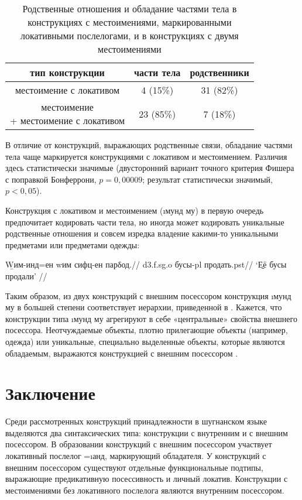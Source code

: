 \begin{table}[h]
 \centering
 \caption{Родственные отношения и обладание частями тела в конструкциях с местоимениями, маркированными локативными послелогами, и в конструкциях с двумя местоимениями}
 \smallskip
 \label{tab:poss9}
 \begin{tabular}{c|cc} \toprule
 тип конструкции & части тела & родственники \\ \midrule
 местоимение с локативом & 4 (15\%) & 31 (82\%) \\
 \makecell{местоимение\\+ местоимение с локативом} & 23 (85\%) & 7 (18\%) \\ \bottomrule
 \end{tabular}
\end{table}

В отличие от конструкций, выражающих родственные связи, обладание частями тела чаще маркируется конструкциями с локативом и местоимением. Различия здесь статистически значимые (двусторонний вариант точного критерия Фишера с поправкой Бонферрони, $p = 0,00009$; результат статистически значимый, $p < 0,05$).

Конструкция с локативом и местоимением (\i{мунд му}) в первую очередь предпочитает кодировать части тела, но иногда может кодировать уникальные родственные отношения и совсем изредка владение какими-то уникальными предметами или предметами одежды:

\begingl
\gla \b{Wим-инд}=ен wим сифц-ен парδод.//
 {\sc d3.f.sg.o} бусы-{\sc pl} продать.{\sc pst}//
\glft ‘\b{Её} бусы продали’ //
\endgl \xe

Таким образом, из двух конструкций с внешним посессором конструкция \i{мунд му} в большей степени соответствует иерархии, приведенной в \parencite{koenig_haspelmath1997}. Кажется, что конструкции типа \i{мунд му} агрегируют в себе «центральные» свойства внешнего посессора. Неотчуждаемые объекты, плотно прилегающие объекты (например, одежда) или уникальные, специально выделенные объекты, которые являются обладаемым, выражаются конструкцией с внешним посессором \parencite{kibrik_etal2006}.

\section{Заключение}

Среди рассмотренных конструкций принадлежности в шугнанском языке выделяются два синтаксических типа: конструкции с внутренним и с внешним посессором. В образовании конструкций с внешним посессором участвует локативный послелог =\i{анд}, маркирующий обладателя. У конструкций с внешним посессором существуют отдельные функциональные подтипы, выражающие предикативную посессивность и личный локатив. Конструкции с местоимениями без локативного послелога являются внутренним посессором.

